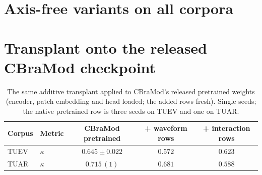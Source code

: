 \section{Axis-free variants on all corpora}
\label{app:variants}

\begin{table}[h]
\centering
\small
\caption{Every axis-free variant on every corpus, single seeds; the
tri-axial duplex model (three seeds) for reference. ``all'' = fold +
strength + $d{=}192$.}
\label{tab:variants-all}
\end{table}

\section{Transplant onto the released CBraMod checkpoint}
\label{app:transplant-pre}

\begin{table}[h]
\centering
\small
\caption{The same additive transplant applied to CBraMod's released
pretrained weights (encoder, patch embedding and head loaded; the added
rows fresh). Single seeds; the native pretrained row is three seeds on
TUEV and one on TUAR.}
\label{tab:transplant-pre}
\begin{tabular}{llccc}
\toprule
Corpus & Metric & CBraMod pretrained & + waveform rows & + interaction rows \\
\midrule
TUEV & $\kappa$ & $\mathbf{0.645 \pm 0.022}$ & $0.572$ & $0.623$ \\
TUAR & $\kappa$ & $\mathbf{0.715}\,(1)$ & $0.681$ & $0.588$ \\
\bottomrule
\end{tabular}
\end{table}

